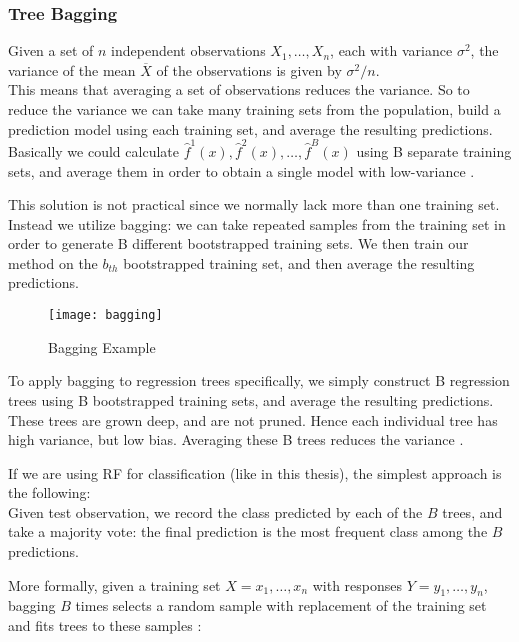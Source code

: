 \subsubsection{Tree Bagging}
Given a set of $n$ independent observations $X_1, \dots, X_n$, each with variance $\sigma^2$, the variance of the mean $\overline{X}$ of the observations is given by $\sigma^2/n$. \\
This means that averaging a set of observations reduces the variance. So to reduce the variance we can take many training sets from the population, build a prediction model using each training set, and average the resulting predictions. \\
Basically we could calculate $\hat{f}^1(x), \hat{f}^2(x), \dots, \hat{f}^B(x)$ using B separate training sets, and average them in order to obtain a single model with low-variance \cite{ISLR}.

This solution is not practical since we normally lack more than one training set. \\
Instead we utilize bagging: we can take repeated samples from the training set in order to generate B different bootstrapped training sets. We then train our method on the $b_{th}$ bootstrapped training set, and then average the resulting predictions.

\begin{figure}[H]
	\centering
	\texttt{[image: bagging]}
	\caption{Bagging Example \cite{bagging}}
	\label{fig:bagging}
\end{figure}

To apply bagging to regression trees specifically, we simply construct B regression trees using B bootstrapped training sets, and average the resulting predictions. These trees are grown deep, and are not pruned. Hence each individual tree has high variance, but low bias. Averaging these B trees reduces the variance \cite{ISLR}.

If we are using RF for classification (like in this thesis), the simplest approach is the following: \\
Given test observation, we record the class predicted by each of the $B$ trees, and take a majority vote: the final prediction is the most frequent class among the $B$ predictions.

More formally, given a training set $X = x_1, \dots, x_n$ with responses $Y = y_1, \dots, y_n$, bagging $B$ times selects a random sample with replacement of the training set and fits trees to these samples \cite{wiki:randomforest}:

